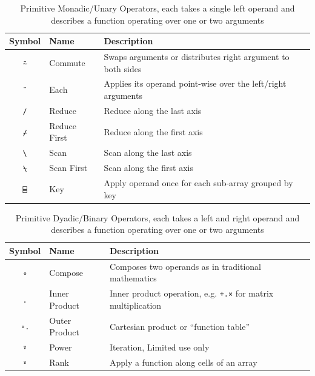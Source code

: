 ﻿\documentclass[numbers,10pt,preprint]{sigplanconf}
\begin{document}
\begin{table}
\centering
\begin{tabular}{cll}
\toprule
Symbol     & Name & Description \\
\midrule
\texttt{⍨} & Commute & Swaps arguments or distributes
 right argument to both sides \\
\texttt{¨} & Each & Applies its operand point-wise over the left/right
 arguments \\
\texttt{/} & Reduce & Reduce along the last axis \\
\texttt{⌿} & Reduce First & Reduce along the first axis \\
\texttt{\textbackslash} & Scan & Scan along the last axis \\
\texttt{⍀} & Scan First & Scan along the first axis \\
\texttt{⌸} & Key & Apply operand once for each sub-array grouped by key \\
\end{tabular}
\caption{Primitive Monadic/Unary Operators, each takes a single left
operand and describes a function operating over one or two arguments}
\label{tab:adverbs}
\end{table}

\begin{table}
\centering
\begin{tabular}{cll}
\toprule
Symbol     & Name & Description \\
\midrule
\texttt{∘} & Compose & Composes two operands as in traditional mathematics \\
\texttt{.} & Inner Product & Inner product operation, e.g.
 \texttt{+.×} for matrix multiplication \\
\texttt{∘.} & Outer Product & Cartesian product or ``function table'' \\
\texttt{⍣} & Power & Iteration, Limited use only \\
\texttt{⍤} & Rank & Apply a function along cells of an array \\
\end{tabular}
\caption{Primitive Dyadic/Binary Operators, each takes a left
 and right operand and describes a function operating over one or two arguments}
\label{tab:conjunctions}
\end{table}
\end{document}
